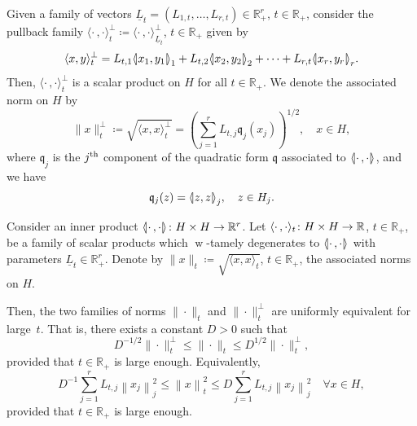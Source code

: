 \documentclass[AHL,Unicode,longabstracts]{cedram}
\newcommand{\innone}[2]{{\langle#2\rangle_{#1}}}
\newcommand{\llangle}{\mathopen{\langle\mkern -3.1mu\lvert}}
\newcommand{\rrangle}{\mathclose{\rvert\mkern -3.1mu\rangle}}
\newcommand{\highinn}[2]{{\llangle#2\rrangle_{#1}}}
\newcommand{\innoneorth}[2]{{\langle#2\rangle^{\perp}_{#1}}}
\newcommand{\norm}[1]{\|#1\|}
\newcommand{\normbsq}[1]{\left\|#1\right\|^{2}}
\newcommand{\normorth}[1]{\|#1\|^{\perp}}
\DeclareMathOperator{\weak}{w}
\newcommand{\R}{\mathbb{R}}
\newcommand{\qf}{\mathfrak{q}}
\renewcommand*{\to}{\mathchoice{\longrightarrow}{\rightarrow}{\rightarrow}{\rightarrow}}
\let\oldforall\forall
\renewcommand*{\forall}{\mathrel{\oldforall}}
\begin{document}
Given a family of vectors $\underline L_t =(L_{1,t}, \dots, L_{r,t}) \in \R_+^r$, $t \in \R_+$, consider the pullback family $\innoneorth{t}{\cdot\,,\cdot} \coloneqq \innoneorth{\underline L_t}{\cdot\,,\cdot}$, $t \in \R_+$ given by
\[
\innoneorth{t}{x,y} = L_{t,1}\highinn{1}{x_1, y_1} + L_{t,2}\highinn{2}{x_2, y_2}+ \dots+L_{r,t}\highinn{r}{x_r, y_r}.
\]
Then, $\innoneorth{t}{\cdot\,, \cdot}$ is a scalar product on $H$ for all $t \in \R_+$. We denote the associated norm on $H$ by
\[
\normorth{x}_t \coloneqq \sqrt{\innoneorth{t}{x, x}} = \left(\sum_{j=1}^r L_{t,j} \qf_j(x_j) \right)^{1/2}, \quad x \in H,
\]
where $\qf_j$ is the $j^{\rm th}$ component of the quadratic form $\qf$ associated to $\highinn{}{\cdot\,,\cdot}$, and we have
\[
\qf_j(z) = \highinn{j}{z, z}, \quad z \in H_j.
\]
\begin{prop} \label{prop:apriori_estimate}
Consider an inner product $\highinn{}{\cdot\,, \cdot} \colon H \times H \to \R^r$. Let $\innone{t}{\cdot \,, \cdot} \colon H \times H \to \R$, $t \in \R_+$, be a family of scalar products which $\weak$-tamely degenerates to $\highinn{}{\cdot\,, \cdot}$ with parameters $\underline L_t \in \R_+^r$. Denote by $\norm{x}_t \coloneqq \sqrt{\innone{t}{x,x}}$, $t \in \R_+$, the associated norms on $H$.

Then, the two families of norms $\norm{\cdot}_t $ and $\normorth{\cdot}_t$ are uniformly equivalent for large~$t$. That is, there exists a constant $D >0$ such that
\[
D^{-1/2} \normorth{\cdot}_t \le \norm{\cdot}_t \le D^{1/2} \normorth{\cdot}_t,
\]
provided that $t \in \R_+$ is large enough. Equivalently,
\begin{equation}\label{eq:apriori_estimate}
D^{-1} \sum_{j=1}^r L_{t,j} \left\|x_j\right\|^2_j \le \normbsq{x}_t \le D \sum_{j=1}^r L_{t,j} \normbsq{x_j}_j \quad \forall x\in H,
\end{equation}
provided that $t \in \R_+$ is large enough.
\end{prop}
\end{document}

